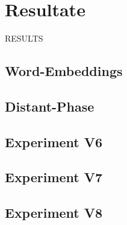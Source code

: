 \chapter{Resultate}
RESULTS
\section{Word-Embeddings}
\blindtext
\section{Distant-Phase}
\blindtext
\section{Experiment V6}
\blindtext
\section{Experiment V7}
\blindtext
\section{Experiment V8}
\blindtext